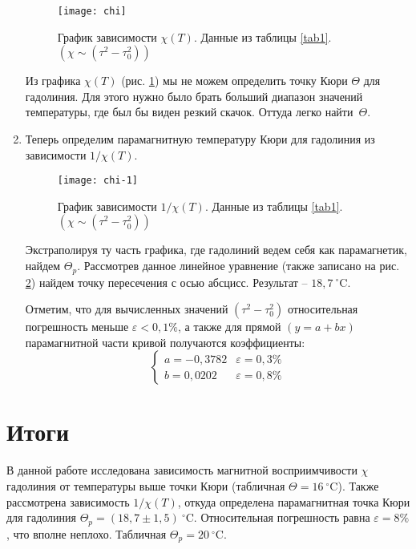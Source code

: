 \documentclass{lab}
\newcommand{\Cd}{^{\circ}\mathrm{C}}
\begin{document}
\begin{enumerate}
\begin{figure}[H]
	\centering
	\texttt{[image: chi]}
	\caption{\footnotesize
		График зависимости $ \chi(T) $. Данные из таблицы \ref{tab1}.\\
		$ \left( \chi \sim (\tau^2 - \tau_0^2) \right) $
	}
	\label{chi}
\end{figure}

Из графика $ \chi(T) $ (рис. \ref{chi}) мы не можем определить точку Кюри $ \Theta $ для
гадолиния. Для этого нужно было брать больший диапазон значений температуры, где был бы виден
резкий скачок. Оттуда легко найти~$ \Theta $.

\item
Теперь определим парамагнитную температуру Кюри для гадолиния из зависимости $ 1/\chi(T) $.
\vspace{-0.5cm}
\begin{figure}[H]
	\centering
	\texttt{[image: chi-1]}
	\caption{\footnotesize
		График зависимости $ 1/\chi(T) $. Данные из таблицы \ref{tab1}.\\
		$ \left( \chi \sim (\tau^2 - \tau_0^2) \right) $
	}
	\label{chi-1}
\end{figure}
\vspace{-0.5cm}
Экстраполируя ту часть графика, где гадолиний ведем себя как парамагнетик, найдем $ \Theta_p $.
Рассмотрев данное линейное уравнение (также записано на рис. \ref{chi-1}) найдем точку
пересечения с осью абсцисс. Результат -- $ 18,7~\Cd $.

Отметим, что для вычисленных значений $ (\tau^2 - \tau_0^2) $ относительная погрешность
меньше $ \varepsilon < 0,1\% $, а также для прямой $ (y = a + bx) $ парамагнитной части кривой
получаются коэффициенты:
\vspace{-0.4cm}
\begin{equation}
\begin{cases}
a = -0,3782		&\varepsilon = 0,3\%	\\
b = 0,0202		&\varepsilon = 0,8\%
\end{cases}
\end{equation}
\end{enumerate}

\section*{Итоги}
\hspace*{\parindent}
В данной работе исследована зависимость магнитной восприимчивости $ \chi $ гадолиния от
температуры выше точки Кюри (табличная $ \Theta = 16~\Cd $). Также рассмотрена зависимость
$ 1/\chi(T) $, откуда определена парамагнитная точка Кюри для гадолиния
$ \Theta_p = (18,7 \pm 1,5)~\Cd $. Относительная погрешность равна $ \varepsilon = 8\% $, что
вполне неплохо. Табличная $ \Theta_p = 20~\Cd $. 
\end{document}
